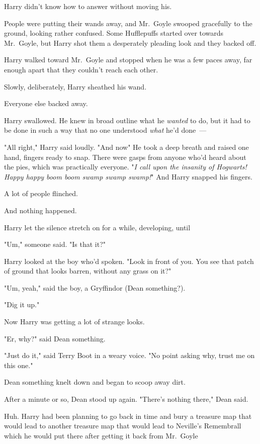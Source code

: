 Harry didn't know how to answer without moving his.

People were putting their wands away, and Mr.~Goyle swooped gracefully to the
ground, looking rather confused. Some Hufflepuffs started over towards
Mr.~Goyle, but Harry shot them a desperately pleading look and they backed off.

Harry walked toward Mr.~Goyle and stopped when he was a few paces away, far
enough apart that they couldn't reach each other.

Slowly, deliberately, Harry sheathed his wand.

Everyone else backed away.

Harry swallowed. He knew in broad outline what he \emph{wanted} to do, but it
had to be done in such a way that no one understood \emph{what} he'd done~---

"All right," Harry said loudly. "And now{\el}" He took a deep breath and
raised one hand, fingers ready to snap. There were gasps from anyone who'd
heard about the pies, which was practically everyone. "\emph{I call upon the
insanity of Hogwarts! Happy happy boom boom swamp swamp swamp!}" And Harry
snapped his fingers.

A lot of people flinched.

And nothing happened.

Harry let the silence stretch on for a while, developing, until{\el}

"Um," someone said. "Is that it?"

Harry looked at the boy who'd spoken. "Look in front of you. You see that patch
of ground that looks barren, without any grass on it?"

"Um, yeah," said the boy, a Gryffindor (Dean something?).

"Dig it up."

Now Harry was getting a lot of strange looks.

"Er, why?" said Dean something.

"Just do it," said Terry Boot in a weary voice. "No point asking why, trust me
on this one."

Dean something knelt down and began to scoop away dirt.

After a minute or so, Dean stood up again. "There's nothing there," Dean said.

Huh. Harry had been planning to go back in time and bury a treasure map that
would lead to another treasure map that would lead to Neville's Remembrall
which he would put there after getting it back from Mr.~Goyle{\el}

